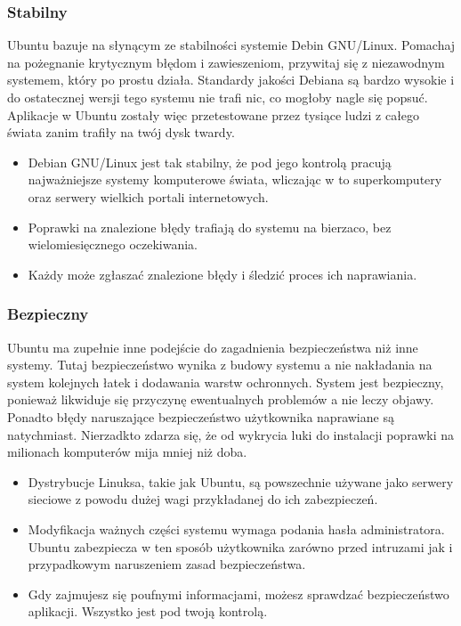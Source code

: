 \subsubsection{Stabilny}
Ubuntu bazuje na słynącym ze stabilności systemie Debin GNU/Linux. Pomachaj na pożegnanie krytycznym błędom i zawieszeniom, przywitaj się z niezawodnym systemem, który po prostu działa. Standardy jakości Debiana są bardzo wysokie i do ostatecznej wersji tego systemu nie trafi nic, co mogłoby nagle się popsuć. Aplikacje w Ubuntu zostały więc przetestowane przez tysiące ludzi z całego świata zanim trafiły na twój dysk twardy.
\begin{itemize}
\item Debian GNU/Linux jest tak stabilny, że pod jego kontrolą pracują najważniejsze systemy komputerowe świata, wliczając w to superkomputery oraz serwery wielkich portali internetowych.
\item Poprawki na znalezione błędy trafiają do systemu na bierzaco, bez wielomiesięcznego oczekiwania.
\item Każdy może zgłaszać znalezione błędy i śledzić proces ich naprawiania.
\end{itemize}
\subsubsection{Bezpieczny}
Ubuntu ma zupełnie inne podejście do zagadnienia bezpieczeństwa niż inne systemy. Tutaj bezpieczeństwo wynika z budowy systemu a nie nakładania na system kolejnych łatek i dodawania warstw ochronnych. System jest bezpieczny, ponieważ likwiduje się przyczynę ewentualnych problemów a nie leczy objawy. Ponadto błędy naruszające bezpieczeństwo użytkownika naprawiane są natychmiast. Nierzadkto zdarza się, że od wykrycia luki do instalacji poprawki na milionach komputerów mija mniej niż doba.
\begin{itemize}
\item Dystrybucje Linuksa, takie jak Ubuntu, są powszechnie używane jako serwery sieciowe z powodu dużej wagi przykładanej do ich zabezpieczeń.
\item Modyfikacja ważnych części systemu wymaga podania hasła administratora. Ubuntu zabezpiecza w ten sposób użytkownika zarówno przed intruzami jak i przypadkowym naruszeniem zasad bezpieczeństwa.
\item Gdy zajmujesz się poufnymi informacjami, możesz sprawdzać bezpieczeństwo aplikacji. Wszystko jest pod twoją kontrolą.
\end{itemize}
